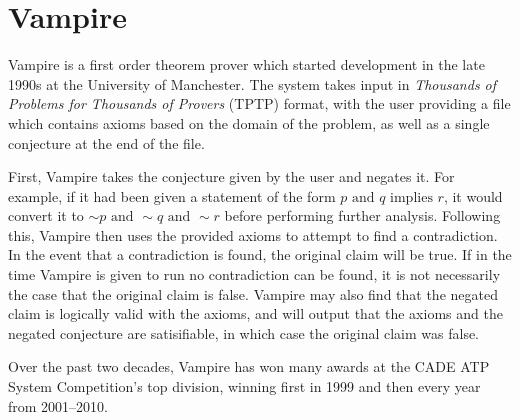 \section{Vampire}

Vampire is a first order theorem prover which started development in the late 1990s at the University of Manchester. The system takes input in \textit{Thousands of Problems for Thousands of Provers} (TPTP) format, with the user providing a file which contains axioms based on the domain of the problem, as well as a single conjecture at the end of the file.

First, Vampire takes the conjecture given by the user and negates it. For example, if it had been given a statement of the form $p \text{ and } q \text{ implies } r$, it would convert it to $\sim p \text{ and } \sim q \text{ and } \sim r$ before performing further analysis. Following this, Vampire then uses the provided axioms to attempt to find a contradiction. In the event that a contradiction is found, the original claim will be true. If in the time Vampire is given to run no contradiction can be found, it is not necessarily the case that the original claim is false. Vampire may also find that the negated claim is logically valid with the axioms, and will output that the axioms and the negated conjecture are satisifiable, in which case the original claim was false.

Over the past two decades, Vampire has won many awards at the CADE ATP System Competition's top division, winning first in 1999 and then every year from 2001--2010.
